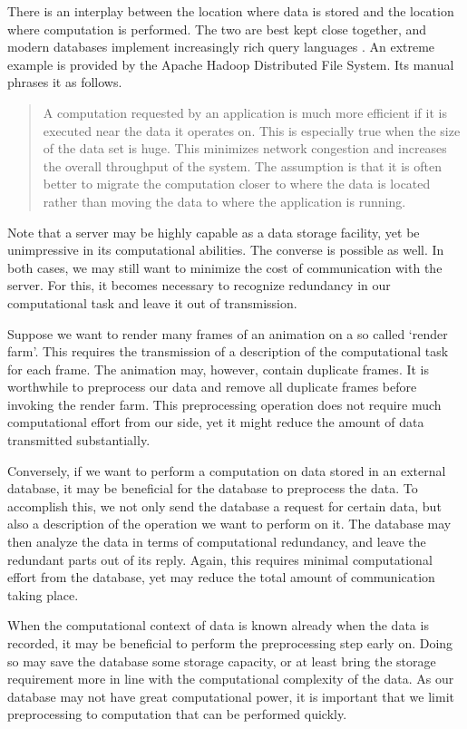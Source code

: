 There is an interplay between the location where data is stored and the location where computation is performed.
The two are best kept close together, and modern databases implement increasingly rich query languages \parencite[see also][]{agarwal2015succinct}.
An extreme example is provided by the {Apache} {Hadoop} Distributed File System.
Its manual phrases it as follows.
\blockcquote{borthakur:hdfs}{
  A computation requested by an application is much more efficient if it is executed near the data it operates on.
  This is especially true when the size of the data set is huge.
  This minimizes network congestion and increases the overall throughput of the system.
  The assumption is that it is often better to migrate the computation closer to where the data is located rather than moving the data to where the application is running.
}

Note that a server may be highly capable as a data storage facility, yet be unimpressive in its computational abilities.
The converse is possible as well.
In both cases, we may still want to minimize the cost of communication with the server.
For this, it becomes necessary to recognize redundancy in our computational task and leave it out of transmission.
\begin{example}
  Suppose we want to render many frames of an animation on a so called `render farm'.
  This requires the transmission of a description of the computational task for each frame.
  The animation may, however, contain duplicate frames.
  It is worthwhile to preprocess our data and remove all duplicate frames before invoking the render farm.
  This preprocessing operation does not require much computational effort from our side, yet it might reduce the amount of data transmitted substantially.

  Conversely, if we want to perform a computation on data stored in an external database, it may be beneficial for the database to preprocess the data.
  To accomplish this, we not only send the database a request for certain data, but also a description of the operation we want to perform on it.
  The database may then analyze the data in terms of computational redundancy, and leave the redundant parts out of its reply.
  Again, this requires minimal computational effort from the database, yet may reduce the total amount of communication taking place.
\end{example}

When the computational context of data is known already when the data is recorded, it may be beneficial to perform the preprocessing step early on.
Doing so may save the database some storage capacity, or at least bring the storage requirement more in line with the computational complexity of the data.
As our database may not have great computational power, it is important that we limit preprocessing to computation that can be performed quickly.

